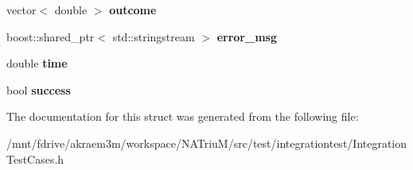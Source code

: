 \begin{DoxyCompactItemize}
\item 
\hypertarget{structnatrium_1_1IntegrationTestCases_1_1TestResult_ac38f2c7a01b0e0501cadf4775bc26572}{
vector$<$ double $>$ {\bfseries outcome}}
\label{structnatrium_1_1IntegrationTestCases_1_1TestResult_ac38f2c7a01b0e0501cadf4775bc26572}

\item 
\hypertarget{structnatrium_1_1IntegrationTestCases_1_1TestResult_a7d0ecf418699d9754fa0a3bed2e34f48}{
boost::shared\_\-ptr$<$ std::stringstream $>$ {\bfseries error\_\-msg}}
\label{structnatrium_1_1IntegrationTestCases_1_1TestResult_a7d0ecf418699d9754fa0a3bed2e34f48}

\item 
\hypertarget{structnatrium_1_1IntegrationTestCases_1_1TestResult_af8b68ac3c5257163877d52c06d599424}{
double {\bfseries time}}
\label{structnatrium_1_1IntegrationTestCases_1_1TestResult_af8b68ac3c5257163877d52c06d599424}

\item 
\hypertarget{structnatrium_1_1IntegrationTestCases_1_1TestResult_abfd745aedfa8bfb6c6f2d93f61294954}{
bool {\bfseries success}}
\label{structnatrium_1_1IntegrationTestCases_1_1TestResult_abfd745aedfa8bfb6c6f2d93f61294954}

\end{DoxyCompactItemize}


The documentation for this struct was generated from the following file:\begin{DoxyCompactItemize}
\item 
/mnt/fdrive/akraem3m/workspace/NATriuM/src/test/integrationtest/IntegrationTestCases.h\end{DoxyCompactItemize}
